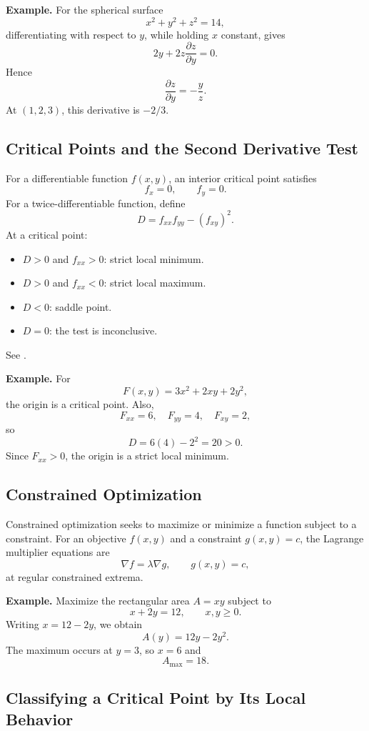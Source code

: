 \documentclass[a4paper,12pt]{article}
\theoremstyle{mystyle}
\numberwithin{equation}{section}
\numberwithin{theorem}{section}
\numberwithin{proposition}{section}
\numberwithin{example}{section}
\numberwithin{remark}{section}
\numberwithin{lemma}{section}
\numberwithin{corollary}{section}
\numberwithin{definition}{section}
\begin{document}
\textbf{Example.}
For the spherical surface
\[
x^2+y^2+z^2=14,
\]
differentiating with respect to \(y\), while holding \(x\) constant,
gives
\[
2y+2z\frac{\partial z}{\partial y}=0.
\]
Hence
\[
\frac{\partial z}{\partial y}=-\frac{y}{z}.
\]
At \((1,2,3)\), this derivative is \(-2/3\).

\subsection{Critical Points and the Second Derivative Test}

For a differentiable function \(f(x,y)\), an interior critical point
satisfies
\[
f_x=0,\qquad f_y=0.
\]
For a twice-differentiable function, define
\[
D=f_{xx}f_{yy}-(f_{xy})^2.
\]
At a critical point:
\begin{itemize}
    \item \(D>0\) and \(f_{xx}>0\): strict local minimum.
    \item \(D>0\) and \(f_{xx}<0\): strict local maximum.
    \item \(D<0\): saddle point.
    \item \(D=0\): the test is inconclusive.
\end{itemize}
See \cite{openstax2016}.

\textbf{Example.}
For
\[
F(x,y)=3x^2+2xy+2y^2,
\]
the origin is a critical point. Also,
\[
F_{xx}=6,\quad F_{yy}=4,\quad F_{xy}=2,
\]
so
\[
D=6(4)-2^2=20>0.
\]
Since \(F_{xx}>0\), the origin is a strict local minimum.

\subsection{Constrained Optimization}

Constrained optimization seeks to maximize or minimize a function
subject to a constraint. For an objective \(f(x,y)\) and a constraint
\(g(x,y)=c\), the Lagrange multiplier equations are
\[
\nabla f=\lambda\nabla g,\qquad g(x,y)=c,
\]
at regular constrained extrema.

\textbf{Example.}
Maximize the rectangular area \(A=xy\) subject to
\[
x+2y=12,\qquad x,y\geq0.
\]
Writing \(x=12-2y\), we obtain
\[
A(y)=12y-2y^2.
\]
The maximum occurs at \(y=3\), so \(x=6\) and
\[
A_{\max}=18.
\]

\subsection{Classifying a Critical Point by Its Local Behavior}
\end{document}
